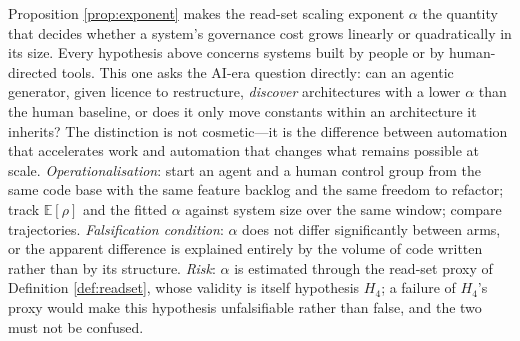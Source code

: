 \begin{hypothesis}\label{hyp:h14}
Proposition \ref{prop:exponent} makes the read-set scaling exponent $\alpha$ the quantity that
decides whether a system's governance cost grows linearly or quadratically in its size. Every
hypothesis above concerns systems built by people or by human-directed tools. This one asks the
AI-era question directly: can an agentic generator, given licence to restructure, \emph{discover}
architectures with a lower $\alpha$ than the human baseline, or does it only move constants within
an architecture it inherits? The distinction is not cosmetic---it is the difference between
automation that accelerates work and automation that changes what remains possible at scale.
\emph{Operationalisation}: start an agent and a human control group from the same code base with the
same feature backlog and the same freedom to refactor; track $\mathbb{E}[\rho]$ and the fitted
$\alpha$ against system size over the same window; compare trajectories.
\emph{Falsification condition}: $\alpha$ does not differ significantly between arms, or the apparent
difference is explained entirely by the volume of code written rather than by its structure.
\emph{Risk}: $\alpha$ is estimated through the read-set proxy of Definition \ref{def:readset}, whose
validity is itself hypothesis $H_4$; a failure of $H_4$'s proxy would make this hypothesis
unfalsifiable rather than false, and the two must not be confused.
\end{hypothesis}

